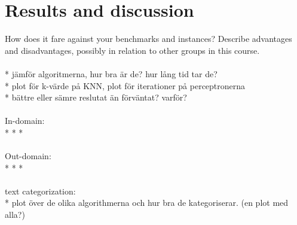\chapter{Results and discussion}

How does it fare against your benchmarks and instances? Describe advantages and disadvantages, possibly in relation to other groups in this course.
\\\\
* jämför algoritmerna, hur bra är de? hur lång tid tar de?\\
* plot för k-värde på KNN, plot för iterationer på perceptronerna\\
* bättre eller sämre reslutat än förväntat? varför?
\\\\
In-domain:\\
*
*
*
\\\\
Out-domain:\\
*
*
*
\\\\
text categorization:\\
* plot över de olika algorithmerna och hur bra de kategoriserar. (en plot med alla?)


